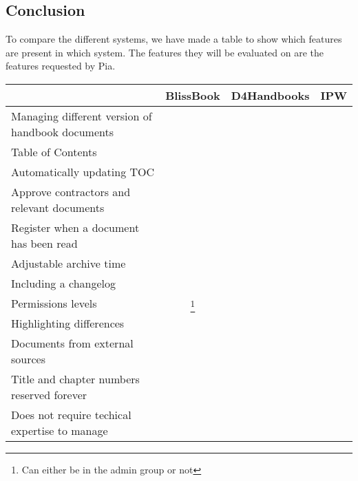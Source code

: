 \subsection{Conclusion}
To compare the different systems, we have made a table to show which features are present in which system. The features they will be evaluated on are the features requested by Pia.
\begin{center}
  \begin{tabular}{| l | c | c | c |}
    \hline
		 & BlissBook & D4Handbooks & IPW \\ \hline
		Managing different version of handbook documents & \checkmark &  &  \\ \hline
		Table of Contents & \checkmark &  &  \\ \hline
		Automatically updating TOC & \checkmark &  &  \\ \hline
		Approve contractors and relevant documents &  &  &  \\ \hline
		Register when a document has been read & \checkmark &  &  \\ \hline
		Adjustable archive time &  &  &  \\ \hline
		Including a changelog & \checkmark &  &  \\ \hline
		Permissions levels & \checkmark\footnote{Can either be in the admin group or not} &  &  \\ \hline
		Highlighting differences & \checkmark &  &  \\ \hline
		Documents from external sources &  &  &  \\ \hline
		Title and chapter numbers reserved forever &  &  &  \\ \hline
		Does not require techical expertise to manage & \checkmark &  &  \\
    \hline
  \end{tabular}
\end{center}


